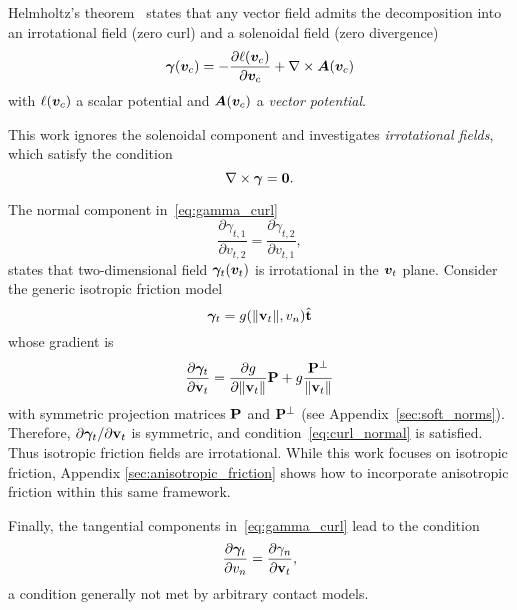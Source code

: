 Helmholtz's theorem~\cite{bib:bhatia2012} states that any vector field admits
the decomposition into an irrotational field (zero curl) and a solenoidal field
(zero divergence)
\begin{eqnarray}
    \bgamma(\vf{v}_c) = -\frac{\partial\ell(\vf{v}_c)}{\partial\vf{v}_c} +
    \nabla\times\vf{A}(\vf{v}_c)
    \label{eq:helmholtz_decomposition}
\end{eqnarray}
with $\ell({\bm{v}}_c)$ a scalar potential and ${\bm{A}}({\bm{v}}_c)$ a \emph{vector
potential}.

This work ignores the solenoidal component and investigates \emph{irrotational
fields}, which satisfy the condition
\begin{equation}
    \nabla\times\bgamma = \mf{0}.
    \label{eq:gamma_curl}
\end{equation}

The normal component in~\eqref{eq:gamma_curl}
\begin{equation}
    \frac{\partial\gamma_{t,1}}{\partial v_{t,2}}=\frac{\partial\gamma_{t,2}}{\partial v_{t,1}},
    \label{eq:curl_normal}
\end{equation}
states that two-dimensional field ${\bm\gamma}_t({\bm{v}}_t)$ is irrotational in the
${\bm{v}}_t$ plane. Consider the generic isotropic friction model
\begin{equation}
    \bgamma_t=g(\Vert\mf{v}_t\Vert, v_n)\hat{\mf{t}}
    \label{eq:generic_friction_model}
\end{equation}
whose gradient is
\begin{equation*}
    \frac{\partial{\bm\gamma}_t}{\partial{\mathbf{v}}_t}=\frac{\partial g}{\partial \Vert{\mathbf{v}}_t\Vert}{\mathbf{P}}+g\frac{{\mathbf{P}}^\perp}{\Vert{\mathbf{v}}_t\Vert}
\end{equation*}
with symmetric projection matrices ${\mathbf{P}}$ and ${\mathbf{P}}^\perp$ (see
Appendix~\ref{sec:soft_norms}). Therefore, $\partial{\bm\gamma}_t/\partial{\mathbf{v}}_t$
is symmetric, and condition~\eqref{eq:curl_normal} is satisfied. Thus isotropic
friction fields are irrotational. While this work focuses on isotropic friction,
Appendix \ref{sec:anisotropic_friction} shows how to incorporate anisotropic
friction within this same framework.

Finally, the tangential components in~\eqref{eq:gamma_curl} lead to the
condition
\begin{equation}
    \frac{\partial\bgamma_t}{\partial v_n}=\frac{\partial\gamma_n}{\partial\mf{v}_t},
    \label{eq:curl_tangent}
\end{equation}
a condition generally not met by arbitrary contact models.
